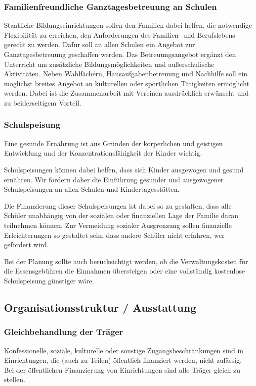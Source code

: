 \subsubsection{Familienfreundliche Ganztagesbetreuung an Schulen}
\abstimmung
Staatliche Bildungseinrichtungen sollen den Familien dabei helfen, die notwendige Flexibilität zu erreichen, den Anforderungen des Familien- und Berufslebens gerecht zu werden. Dafür soll an allen Schulen ein Angebot zur Ganztagesbetreuung geschaffen werden. Das Betreuungsangebot ergänzt den Unterricht um zusätzliche Bildungsmöglichkeiten und außerschulische Aktivitäten. Neben Wahlfächern, Hausaufgabenbetreuung und Nachhilfe soll ein möglichst breites Angebot an kulturellen oder sportlichen Tätigkeiten ermöglicht werden. Dabei ist die Zusammenarbeit mit Vereinen ausdrücklich erwünscht und zu beiderseitigem Vorteil.

\subsubsection{Schulspeisung}
\abstimmung
Eine gesunde Ernährung ist aus Gründen der körperlichen und geistigen Entwicklung und der Konzentrationsfähigkeit der Kinder wichtig.

Schulspeisungen können dabei helfen, dass sich Kinder ausgewogen und gesund ernähren. Wir fordern daher die Einführung gesunder und ausgewogener Schulspeisungen an allen Schulen und Kindertagesstätten.

Die Finanzierung dieser Schulspeisungen ist dabei so zu gestalten, dass alle Schüler unabhängig von der sozialen oder finanziellen Lage der Familie daran teilnehmen können. Zur Vermeidung sozialer Ausgrenzung sollen finanzielle Erleichterungen so gestaltet sein, dass andere Schüler nicht erfahren, wer gefördert wird.

Bei der Planung sollte auch berücksichtigt werden, ob die Verwaltungskosten für die Essensgebühren die Einnahmen übersteigen oder eine vollständig kostenlose Schulspeisung günstiger wäre.
 
\subsection*{Organisationsstruktur / Ausstattung}

\subsubsection{Gleichbehandlung der Träger}
\abstimmung
Konfessionelle, soziale, kulturelle oder sonstige Zugangsbeschränkungen sind in Einrichtungen, die (auch zu Teilen) öffentlich finanziert werden, nicht zulässig. Bei der öffentlichen Finanzierung von Einrichtungen sind alle Träger gleich zu stellen.
 
